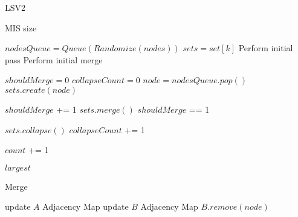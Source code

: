 \documentclass[conference]{IEEEtran}
\begin{document}
    

  \begin{algorithm}
 \caption{LSV2}
 \begin{algorithmic}[1]
 \renewcommand{\algorithmicrequire}{\textbf{Input:}}
 \renewcommand{\algorithmicensure}{\textbf{Output:}}
 \ENSURE  MIS size



        \STATE $nodesQueue = Queue(Randomize(nodes))$
        \STATE $sets = set[k]$
        \STATE Perform initial pass
        \STATE Perform initial merge

        \STATE $shouldMerge = 0$
        \STATE $collapseCount = 0$
            \STATE $node = nodesQueue.pop()$
                \STATE $sets.create(node)$
            \ENDIF

            \STATE $shouldMerge$ += 1
                \STATE $sets.merge()$ 
                \STATE $shouldMerge$ == 1
            \ENDIF

                \STATE $sets.collapse()$ 
                \STATE $collapseCount$ += 1
            \ENDIF
        \ENDWHILE

        \STATE $count$ += 1


    \ENDWHILE


  \RETURN $largest$
 \end{algorithmic} 
\end{algorithm}

  \begin{algorithm}[H]
 \caption{Merge}
 \begin{algorithmic}[1]
 \renewcommand{\algorithmicrequire}{\textbf{Input:}}
 \renewcommand{\algorithmicensure}{\textbf{Output:}}

                \STATE update $A$ Adjacency Map
                \STATE update $B$ Adjacency Map
                \STATE $B.remove(node)$
            \ENDIF
        \ENDIF
    \ENDFOR

 \end{algorithmic} 
\end{algorithm}
\end{document}
